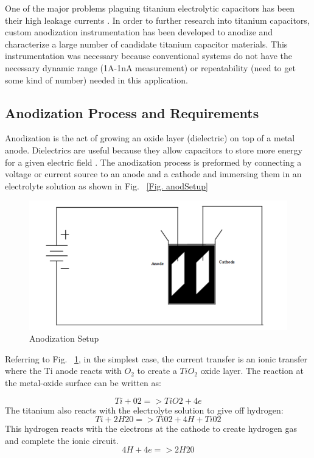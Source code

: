 \documentclass[journal]{IEEEtran}
\begin{document}
One of the major problems plaguing titanium electrolytic capacitors has been their high leakage currents \cite{tiCharHag}. In order to further research into titanium capacitors, custom anodization instrumentation has been developed to anodize and characterize a large number of candidate titanium capacitor materials. This instrumentation was necessary because conventional systems do not have the necessary dynamic range (1A-1nA measurement) or repeatability (need to get some kind of number) needed in this application.


\subsection{Anodization Process and Requirements}

Anodization is the act of growing an oxide layer (dielectric) on top of a metal anode. Dielectrics are useful because they allow capacitors to store more energy for a given electric field \cite{cwruEncDie}. The anodization process is preformed by connecting a voltage or current source to an anode and a cathode and immersing them in an electrolyte solution as shown in Fig. ~\ref{Fig. anodSetup}

\begin{figure}[here]
\centering
\includegraphics{anodSetup}
\caption{Anodization Setup}
\label{fig:anodSetup}
\end{figure}


Referring to Fig. ~\ref{fig:anodSetup}, in the simplest case, the current transfer is an ionic transfer where the Ti anode reacts with $O_{2}$ to create a $TiO_{2}$ oxide layer. The reaction at the metal-oxide surface can be written as:

\begin{equation}
Ti + 02 => TiO2 + 4e
\end{equation}
The titanium also reacts with the electrolyte solution to give off hydrogen:
\begin{equation}
Ti + 2H20 => Ti02 + 4H+Ti02
\end{equation}
This hydrogen reacts with the electrons at the cathode to create hydrogen gas and complete the ionic circuit.
\begin{equation}
4H + 4e => 2H20
\end{equation}
\end{document}
